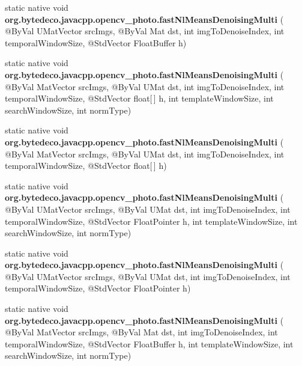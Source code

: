 \begin{DoxyCompactItemize}
\item 
\mbox{\label{group__photo__denoise_gabbd7ea6713a25cd253339c53d49a7fd7}} 
static native void {\bfseries org.\+bytedeco.\+javacpp.\+opencv\+\_\+photo.\+fast\+Nl\+Means\+Denoising\+Multi} ( @By\+Val U\+Mat\+Vector src\+Imgs, @By\+Val Mat dst, int img\+To\+Denoise\+Index, int temporal\+Window\+Size, @Std\+Vector Float\+Buffer h)
\item 
\mbox{\label{group__photo__denoise_gaae076da8a4d95ca099dd43303d7f4235}} 
static native void {\bfseries org.\+bytedeco.\+javacpp.\+opencv\+\_\+photo.\+fast\+Nl\+Means\+Denoising\+Multi} ( @By\+Val Mat\+Vector src\+Imgs, @By\+Val U\+Mat dst, int img\+To\+Denoise\+Index, int temporal\+Window\+Size, @Std\+Vector float\mbox{[}$\,$\mbox{]} h, int template\+Window\+Size, int search\+Window\+Size, int norm\+Type)
\item 
\mbox{\label{group__photo__denoise_ga53d7221c560d23fd9e02920522f4a96c}} 
static native void {\bfseries org.\+bytedeco.\+javacpp.\+opencv\+\_\+photo.\+fast\+Nl\+Means\+Denoising\+Multi} ( @By\+Val Mat\+Vector src\+Imgs, @By\+Val U\+Mat dst, int img\+To\+Denoise\+Index, int temporal\+Window\+Size, @Std\+Vector float\mbox{[}$\,$\mbox{]} h)
\item 
\mbox{\label{group__photo__denoise_gac432e76401d411753ef6458347c37c79}} 
static native void {\bfseries org.\+bytedeco.\+javacpp.\+opencv\+\_\+photo.\+fast\+Nl\+Means\+Denoising\+Multi} ( @By\+Val U\+Mat\+Vector src\+Imgs, @By\+Val U\+Mat dst, int img\+To\+Denoise\+Index, int temporal\+Window\+Size, @Std\+Vector Float\+Pointer h, int template\+Window\+Size, int search\+Window\+Size, int norm\+Type)
\item 
\mbox{\label{group__photo__denoise_ga8299b1fb4d00d33cafc2af9995b249b2}} 
static native void {\bfseries org.\+bytedeco.\+javacpp.\+opencv\+\_\+photo.\+fast\+Nl\+Means\+Denoising\+Multi} ( @By\+Val U\+Mat\+Vector src\+Imgs, @By\+Val U\+Mat dst, int img\+To\+Denoise\+Index, int temporal\+Window\+Size, @Std\+Vector Float\+Pointer h)
\item 
\mbox{\label{group__photo__denoise_ga1ea833dac9b92ec192b96965cf5ebe26}} 
static native void {\bfseries org.\+bytedeco.\+javacpp.\+opencv\+\_\+photo.\+fast\+Nl\+Means\+Denoising\+Multi} ( @By\+Val Mat\+Vector src\+Imgs, @By\+Val Mat dst, int img\+To\+Denoise\+Index, int temporal\+Window\+Size, @Std\+Vector Float\+Buffer h, int template\+Window\+Size, int search\+Window\+Size, int norm\+Type)

\end{DoxyCompactItemize}
